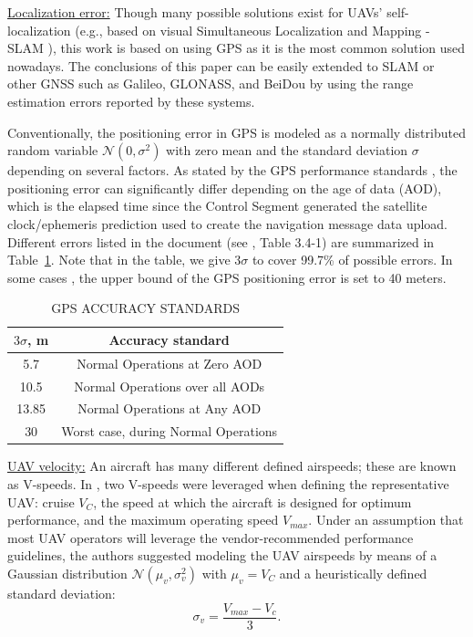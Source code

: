 \documentclass[10pt,conference]{IEEEtran}
\begin{document}
\underline{Localization error:}
Though many possible solutions exist for UAVs' self-localization (e.g., based on visual Simultaneous Localization and Mapping - SLAM \cite{Vinogradov21}), this work is based on using GPS as it is the most common solution used nowadays. The conclusions of this paper can be easily extended to SLAM or other GNSS such as Galileo, GLONASS, and BeiDou by using the range estimation errors reported by these systems. 

Conventionally, the positioning error in GPS is modeled as a normally distributed random variable $\mathcal{N}(0,\sigma^2)$ with zero mean and the standard deviation $\sigma$ depending on several factors. As stated by the GPS performance standards \cite{GPS_SPS_2020}, the positioning error can significantly differ depending on the age of data (AOD), which is the elapsed time since the Control Segment generated the satellite clock/ephemeris prediction used to create the navigation message data upload. Different errors listed in the document (see \cite{GPS_SPS_2020}, Table 3.4-1) are summarized in Table~\ref{tab:gps}. Note that in the table, we give $3\sigma$ to cover 99.7\% of possible errors. In some cases \cite{Bubbles21}, the upper bound of the GPS positioning error is set to 40 meters.
\begin{table}[]
     \caption{GPS ACCURACY STANDARDS \cite{GPS_SPS_2020}}   \centering
    \begin{tabular}{c|c}
        $3\sigma$, m & Accuracy standard \\
        \hline
         5.7& Normal Operations at Zero AOD\\
         10.5&Normal Operations over all AODs\\
         13.85&Normal Operations at Any AOD\\
         30&Worst case, during Normal Operations\\
    \end{tabular}
\vspace{-6mm}
    \label{tab:gps}
\end{table}

\underline{UAV velocity:} %
An aircraft has many different defined airspeeds; these
are known as V-speeds. In \cite{Weinert18}, two V-speeds were leveraged when defining the representative UAV: cruise $V_C$, the speed at which the
aircraft is designed for optimum performance, and the maximum operating speed $V_{max}$. Under an assumption that most UAV operators will leverage the vendor-recommended performance guidelines, the authors suggested modeling the UAV airspeeds by means of a Gaussian distribution $\mathcal{N}(\mu_v,\sigma^2_v)$ with $\mu_v=V_C$ and a heuristically defined standard deviation:
\begin{equation}\label{eq:speed_sigma}
    \sigma_v = \frac{V_{max}-V_c}{3}.
\end{equation}
\end{document}
